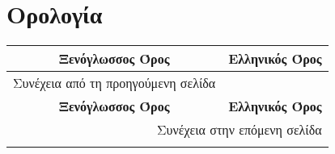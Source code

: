 \chapter{Ορολογία}

\begin{center}
\begin{longtable}{|c|c|}

\hline 
   \multicolumn{1}{|c|}{\textbf{Ξενόγλωσσος Όρος}} &

   \multicolumn{1}{|c|}{\textbf{Ελληνικός Όρος}} \\\hline
\endfirsthead

\multicolumn{1}{c}{Συνέχεια από τη προηγούμενη σελίδα}\\
\hline 
   \multicolumn{1}{|c|}{\textbf{Ξενόγλωσσος Όρος}} &

   \multicolumn{1}{|c|}{\textbf{Ελληνικός Όρος}} \\\hline
\endhead

  \multicolumn{2}{r}{{Συνέχεια στην επόμενη σελίδα}} \\
\endfoot

\endlastfoot



\end{longtable}
\end{center}
